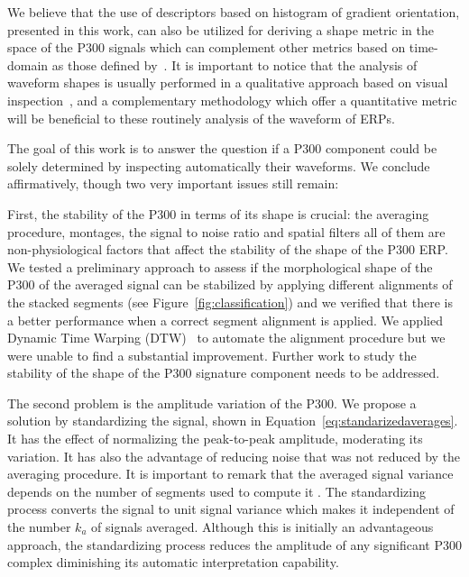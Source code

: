 
We believe that the use of descriptors based on histogram of gradient orientation, presented in this work, can also be utilized for deriving a shape metric in the space of the P300 signals which can complement other metrics based on time-domain as those defined by~\cite{Mak2012}. It is important to notice that the analysis of waveform shapes is usually performed in a qualitative approach based on visual inspection~\cite{SellersandEmanuelDonchin2006}, and a complementary methodology which offer a quantitative metric will be beneficial to these routinely analysis of the waveform of ERPs.


The goal of this work is to answer the question if a P300 component could be solely determined by inspecting automatically their waveforms.  We conclude affirmatively, though two very important issues still remain:

First, the stability of the P300 in terms of its shape is crucial: the averaging procedure, montages, the signal to noise ratio and spatial filters all of them are non-physiological factors that affect the stability of the shape of the P300 ERP.  We tested a preliminary approach to assess if the morphological shape of the P300 of the averaged signal can be stabilized by applying different alignments of the stacked segments (see Figure~\ref{fig:classification}) and we verified that there is a better performance when a correct segment alignment is applied.  We applied Dynamic Time Warping (DTW)~\cite{Casarotto2005} to automate the alignment procedure but we were unable to find a substantial improvement.  Further work to study the stability of the shape of the P300 signature component needs to be addressed.

The second problem is the amplitude variation of the P300. We propose a solution by standardizing the signal, shown in Equation~\ref{eq:standarizedaverages}. It has the effect of normalizing the peak-to-peak amplitude, moderating its variation. It has also the advantage of reducing noise that was not reduced by the averaging procedure.   It is important to remark that the averaged signal variance depends on the number of segments used to compute it \cite{van2006signal}.  The standardizing process converts the signal to unit signal variance which makes it independent of the number $k_a$ of signals averaged.   Although this is initially an advantageous approach, the standardizing process reduces the amplitude of any significant P300 complex diminishing its automatic interpretation capability.


